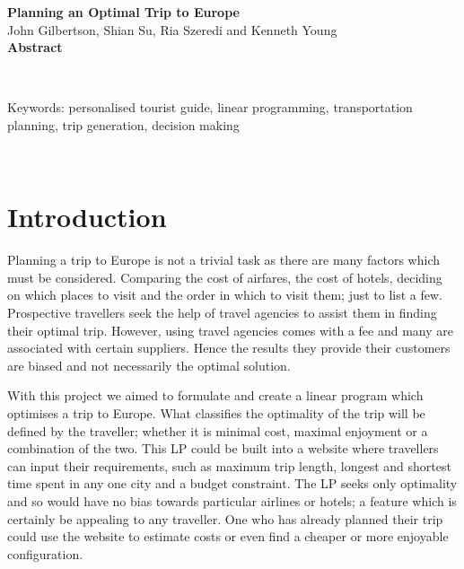 \documentclass[12pt]{article}
\begin{document}
\clearpage
\vspace*{3cm}
\begin{center}
  {\large \bf Planning an Optimal Trip to Europe}\\[+10pt]
  John Gilbertson, Shian Su, Ria Szeredi and Kenneth Young\\[+10pt]
  {\large \bf Abstract}\\[+10pt]
  \parbox{13cm}{\lipsum[3]}
\\[+20pt]
\parbox{13cm}{
Keywords: personalised tourist guide, linear programming, transportation planning, trip generation, decision making}
\\[+20pt]
\end{center}
\vfill
\clearpage

\tableofcontents
\pagebreak


\section{Introduction}
\label{sec:intro}


Planning a trip to Europe is not a trivial task as there are many factors which must be considered. Comparing the cost of airfares, the cost of hotels, deciding on which places to visit and the order in which to visit them; just to list a few. Prospective travellers seek the help of travel agencies to assist them in finding their optimal trip. However, using travel agencies comes with a fee and many are associated with certain suppliers. Hence the results they provide their customers are biased and not necessarily the optimal solution.

With this project we aimed to formulate and create a linear program which optimises a trip to Europe. What classifies the optimality of the trip will be defined by the traveller; whether it is minimal cost, maximal enjoyment or a combination of the two. This LP could be built into a website where travellers can input their requirements, such as maximum trip length, longest and shortest time spent in any one city and a budget constraint. The LP seeks only optimality and so would have no bias towards particular airlines or hotels; a feature which is certainly be appealing to any traveller. One who has already planned their trip could use the website to estimate costs or even find a cheaper or more enjoyable configuration.
\end{document}
